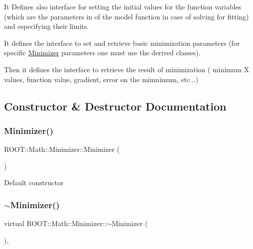 It Defines also interface for setting the initial values for the function variables (which are the parameters in of the model function in case of solving for fitting) and especifying their limits.

It defines the interface to set and retrieve basic minimization parameters (for specific \mbox{\hyperlink{classROOT_1_1Math_1_1Minimizer}{Minimizer}} parameters one must use the derived classes).

Then it defines the interface to retrieve the result of minimization ( minimum X values, function value, gradient, error on the mimnimum, etc...) 

\subsection{Constructor \& Destructor Documentation}
\mbox{\label{classROOT_1_1Math_1_1Minimizer_a6981643dac29da36280b24d32b6d3140}} 
\subsubsection{\texorpdfstring{Minimizer()}{Minimizer()}\hspace{0.1cm}{\footnotesize\ttfamily [1/3]}}
{\footnotesize\ttfamily R\+O\+O\+T\+::\+Math\+::\+Minimizer\+::\+Minimizer (\begin{DoxyParamCaption}{ }\end{DoxyParamCaption})\hspace{0.3cm}{\ttfamily [inline]}}

Default constructor \mbox{\label{classROOT_1_1Math_1_1Minimizer_aa1045455fe657956659bfa7a21ce447e}} 
\subsubsection{\texorpdfstring{$\sim$Minimizer()}{~Minimizer()}\hspace{0.1cm}{\footnotesize\ttfamily [1/3]}}
{\footnotesize\ttfamily virtual R\+O\+O\+T\+::\+Math\+::\+Minimizer\+::$\sim$\+Minimizer (\begin{DoxyParamCaption}{ }\end{DoxyParamCaption})\hspace{0.3cm}{\ttfamily [inline]}, {\ttfamily [virtual]}}

